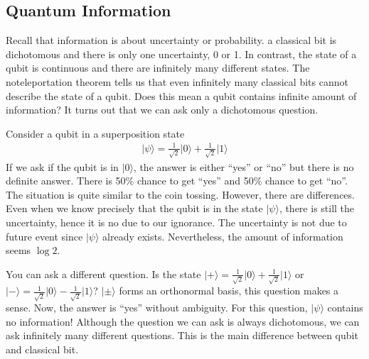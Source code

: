 \documentclass[letterpaper,10pt,english]{jupyterBook}
\begin{document}
\subsection{Quantum Information}
\label{\detokenize{computation/qcomp:quantum-information}}
\sphinxAtStartPar
Recall that information is about uncertainty or probability.  a classical bit is dichotomous and there is only one uncertainty, 0 or 1.  In contrast, the state of a qubit is continuous and there are infinitely many different states.  The no\sphinxhyphen{}teleportation theorem tells us that even infinitely many classical bits cannot describe the state of a qubit.  Does this mean a qubit contains infinite amount of information? It turns out that we can ask only a dichotomous question.

\sphinxAtStartPar
Consider a qubit in a superposition state
\begin{equation*}
\begin{split}
\lvert \psi \rangle = \frac{1}{\sqrt{2}} \lvert 0 \rangle +  \frac{1}{\sqrt{2}} \lvert 1 \rangle
\end{split}
\end{equation*}
\sphinxAtStartPar
If we ask if the qubit is in \(\lvert 0 \rangle\), the answer is either “yes” or “no” but there is no definite answer.  There is 50\% chance to get “yes” and 50\% chance to get “no”.  The situation is quite similar to the coin tossing.
However, there are differences. Even when we know precisely that the qubit is in the state \(\lvert \psi \rangle\), there is still the uncertainty, hence it is no due to our ignorance.  The uncertainty is not due to future event since \(\lvert \psi \rangle\) already exists.  Nevertheless, the amount of information seems \(\log 2\).

\sphinxAtStartPar
You can ask a different question.  Is the state \(\lvert + \rangle =  \frac{1}{\sqrt{2}} \lvert 0 \rangle +  \frac{1}{\sqrt{2}} \lvert 1 \rangle\) or \(\lvert - \rangle =  \frac{1}{\sqrt{2}} \lvert 0 \rangle -  \frac{1}{\sqrt{2}} \lvert 1 \rangle\)?  \(\lvert \pm \rangle\) forms an orthonormal basis, this question makes a sense.  Now, the answer is “yes” without ambiguity.  For this question,  \(\lvert \psi \rangle\) contains no information!   Although the question we can ask is always dichotomous, we can ask infinitely many different questions.  This is the main difference between qubit and classical bit.
\end{document}

